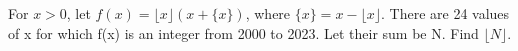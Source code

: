 For $x>0$, let $f(x)=\lfloor x\rfloor(x+\{x\})$, where $\{x\}=x-\lfloor x\rfloor$. There are 24 values of x for which f(x) is an integer from 2000 to 2023. Let their sum be N. Find $\lfloor N\rfloor$.

